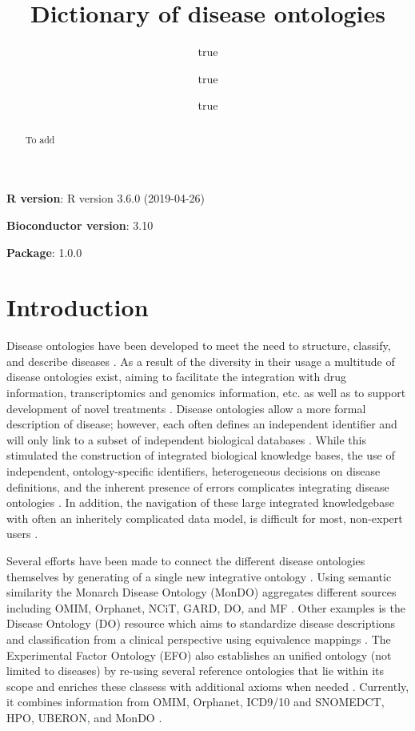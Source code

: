 \documentclass[9pt,a4paper,]{extarticle}
\title{Dictionary of disease ontologies}
\author{true \and true \and true}
\date{}
\begin{document}
\maketitle
\begin{abstract}
To add
\end{abstract}

\textbf{R version}: R version 3.6.0 (2019-04-26)

\textbf{Bioconductor version}: 3.10

\textbf{Package}: 1.0.0

\hypertarget{introduction}{%
\section{Introduction}\label{introduction}}

Disease ontologies have been developed to meet the need to structure, classify, and describe diseases \citep{Gruber1993, Haendel2018, Hoehndorf2013}. As a result of the diversity in their usage a multitude of disease ontologies exist, aiming to facilitate the integration with drug information, transcriptomics and genomics information, etc. as well as to support development of novel treatments \citep{Haendel2018, Hoehndorf2013, Rappaport2013}. Disease ontologies allow a more formal description of disease; however, each often defines an independent identifier and will only link to a subset of independent biological databases \citep{Hasnain2014, Hoehndorf2013, Kibbe2015, Livingston2015, Malone2010, Rappaport2013}. While this stimulated the construction of integrated biological knowledge bases, the use of independent, ontology-specific identifiers, heterogeneous decisions on disease definitions, and the inherent presence of errors complicates integrating disease ontologies \citep{Livingston2015, Rappaport2013}. In addition, the navigation of these large integrated knowledgebase with often an inheritely complicated data model, is difficult for most, non-expert users \citep{Hasnain2014, Hu2017, Livingston2015}.

Several efforts have been made to connect the different disease ontologies themselves by generating of a single new integrative ontology \citep{Mungall2017, Shefchek2019, Rappaport2013}. Using semantic similarity the Monarch Disease Ontology (MonDO) aggregates different sources including OMIM, Orphanet, NCiT, GARD, DO, and MF \citep{Mungall2017, Shefchek2019}. Other examples is the Disease Ontology (DO) resource which aims to standardize disease descriptions and classification from a clinical perspective using equivalence mappings \citep{Cheng2013, Schriml2015, Yu2015}. The Experimental Factor Ontology (EFO) also establishes an unified ontology (not limited to diseases) by re-using several reference ontologies that lie within its scope and enriches these classess with additional axioms when needed \citep{Malone2010}. Currently, it combines information from OMIM, Orphanet, ICD9/10 and SNOMEDCT, HPO, UBERON, and MonDO \citep{EFO2019}.
\end{document}
